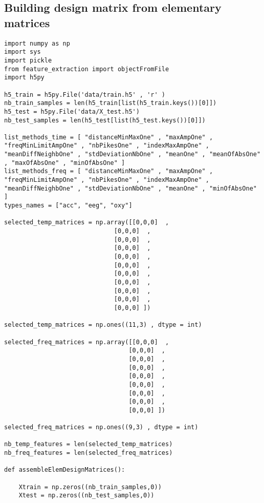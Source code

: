 \documentclass{article}
\begin{document}
\subsection{Building design matrix from elementary matrices}
\begin{lstlisting}
import numpy as np
import sys
import pickle
from feature_extraction import objectFromFile
import h5py

h5_train = h5py.File('data/train.h5' , 'r' )
nb_train_samples = len(h5_train[list(h5_train.keys())[0]]) 
h5_test = h5py.File('data/X_test.h5')
nb_test_samples = len(h5_test[list(h5_test.keys())[0]]) 

list_methods_time = [ "distanceMinMaxOne" , "maxAmpOne" , "freqMinLimitAmpOne" , "nbPikesOne" , "indexMaxAmpOne" , "meanDiffNeighbOne" , "stdDeviationNbOne" , "meanOne" , "meanOfAbsOne" , "maxOfAbsOne" , "minOfAbsOne" ]
list_methods_freq = [ "distanceMinMaxOne" , "maxAmpOne" , "freqMinLimitAmpOne" , "nbPikesOne" , "indexMaxAmpOne" , "meanDiffNeighbOne" , "stdDeviationNbOne" , "meanOne" , "minOfAbsOne" ]
types_names = ["acc", "eeg", "oxy"]

selected_temp_matrices = np.array([[0,0,0]  ,
                              [0,0,0]  ,
                              [0,0,0]  ,
                              [0,0,0]  ,
                              [0,0,0]  ,
                              [0,0,0]  ,
                              [0,0,0]  ,
                              [0,0,0]  ,
                              [0,0,0]  ,
                              [0,0,0]  ,
                              [0,0,0] ])

selected_temp_matrices = np.ones((11,3) , dtype = int)

selected_freq_matrices = np.array([[0,0,0]  ,
                                  [0,0,0]  ,
                                  [0,0,0]  ,
                                  [0,0,0]  ,
                                  [0,0,0]  ,
                                  [0,0,0]  ,
                                  [0,0,0]  ,
                                  [0,0,0]  ,
                                  [0,0,0] ])

selected_freq_matrices = np.ones((9,3) , dtype = int)

nb_temp_features = len(selected_temp_matrices)
nb_freq_features = len(selected_freq_matrices)

def assembleElemDesignMatrices():
    
    Xtrain = np.zeros((nb_train_samples,0))
    Xtest = np.zeros((nb_test_samples,0))
    

\end{lstlisting}
\end{document}
